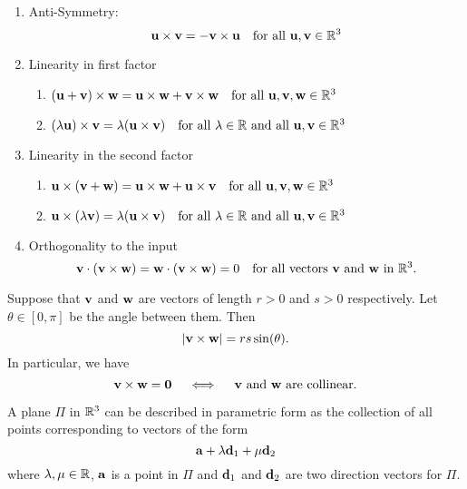 \documentclass[10pt, a4paper]{article}
\begin{document}
\begin{proposition}\phantom{}
    \begin{enumerate}[label = (\roman*)]
        \item Anti-Symmetry:
        \[
        \mathbf{u \times v = -v \times u}\quad\text{for all }\mathbf{u, v} \in \mathbb{R} ^ 3
        \]
        \item Linearity in first factor
        \begin{enumerate}[label = (\arabic*)]
            \item $(\mathbf{u + v}) \times \mathbf{w} = \mathbf{u \times w} + \mathbf{v \times w}\quad\text{for all }\mathbf{u, v, w} \in \mathbb{R} ^ 3$
            \item $(\lambda\mathbf{u}) \times \mathbf{v} = \lambda(\mathbf{u \times v})\quad\text{for all } \lambda \in \mathbb{R} \text{ and all }\mathbf{u, v} \in \mathbb{R} ^ 3$
        \end{enumerate}
        \item Linearity in the second factor
        \begin{enumerate}[label = (\arabic*)]
            \item $\mathbf{u} \times (\mathbf{v + w}) = \mathbf{u \times w} + \mathbf{u \times v}\quad\text{for all }\mathbf{u, v, w} \in \mathbb{R} ^ 3$
            \item $\mathbf{u} \times (\lambda\mathbf{v}) = \lambda(\mathbf{u \times v})\quad\text{for all } \lambda \in \mathbb{R} \text{ and all }\mathbf{u, v} \in \mathbb{R} ^ 3$
        \end{enumerate}
        \item Orthogonality to the input
        \[
        \mathbf{v} \cdot (\mathbf{v \times w}) = \mathbf{w} \cdot (\mathbf{v \times w}) = 0\quad\text{for all vectors } \mathbf{v} \text{ and } \mathbf{w} \text{ in } \mathbb{R} ^ 3.
        \]
    \end{enumerate}
\end{proposition}

\begin{lemma}
    Suppose that $\mathbf{v}$ and $\mathbf{w}$ are vectors of length $r > 0$ and $s > 0$ respectively. Let $\theta \in [0, \pi]$ be the angle between them. Then
    \[
    |\mathbf{v \times w}| = rs\sin(\theta).
    \]
    In particular, we have
    \[
    \mathbf{v \times w = 0}\quad\iff\quad\mathbf{v}\text{ and }\mathbf{w}\text{ are collinear}.
    \]
\end{lemma}

\begin{definition}
    A plane $\Pi$ in $\mathbb{R} ^ 3$ can be described in parametric form as the collection of all points corresponding to vectors of the form
    \[
    \mathbf{a} + \lambda\mathbf{d}_1 + \mu\mathbf{d}_2
    \]
    where $\lambda, \mu \in \mathbb{R}$,
    $\mathbf{a}$ is a point in $\Pi$ and $\mathbf{d}_1$ and $\mathbf{d}_2$ are two direction vectors for $\Pi$.
\end{definition}
\end{document}
